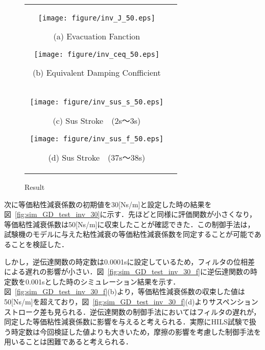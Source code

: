 \documentclass[a4paper,12pt]{article_vdlab_sotsuron}
\begin{document}
\begin{figure}[h!]
    \begin{tabular}{cc}
      \begin{minipage}{0.5\hsize}
        \centering
        \texttt{[image: figure/inv\_J\_50.eps]}
        \begin{center}
          \vspace{-4mm}
          \ (a) Evacuation Fanction\
        \end{center}
      \end{minipage}
      \begin{minipage}{0.5\hsize}
        \centering
        \texttt{[image: figure/inv\_ceq\_50.eps]}
        \begin{center}
          \vspace{-4mm}
          \ (b)  Equivalent Damping Confficient\
        \end{center}
      \end{minipage}\\
        \begin{minipage}{0.5\hsize}
          \centering
          \texttt{[image: figure/inv\_sus\_s\_50.eps]}
          \begin{center}
            \vspace{-4mm}
            \ (c) Sus Stroke　(2s～3s)\
          \end{center}
        \end{minipage}
        \begin{minipage}{0.5\hsize}
          \centering
          \texttt{[image: figure/inv\_sus\_f\_50.eps]}
          \begin{center}
            \vspace{-4mm}
            \ (d) Sus Stroke　(37s～38s)\
          \end{center}
        \end{minipage}
      \end{tabular}
      \vspace{1mm}
    \caption{Result}
    \label{fig:sim_GD_test_inv_50}
\end{figure}
\newpage
次に等価粘性減衰係数の初期値を30[Ns/m]と設定した時の結果を図~\ref{fig:sim_GD_test_inv_30}に示す．先ほどと同様に評価関数が小さくなり，等価粘性減衰係数は50[Ns/m]に収束したことが確認できた．この制御手法は，試験機のモデルに与えた粘性減衰の等価粘性減衰係数を同定することが可能であることを検証した．
\par
しかし，逆伝達関数の時定数は0.0001sに設定しているため，フィルタの位相差による遅れの影響が小さい．図~\ref{fig:sim_GD_test_inv_30_f}に逆伝達関数の時定数を0.001sとした時のシミュレーション結果を示す．図~\ref{fig:sim_GD_test_inv_30_f}(b)より，等価粘性減衰係数の収束した値は50[Ns/m]を超えており，図~\ref{fig:sim_GD_test_inv_30_f}(d)よりサスペンションストローク差も見られる．逆伝達関数の制御手法においてはフィルタの遅れが，同定した等価粘性減衰係数に影響を与えると考えられる．実際にHILS試験で扱う時定数は今回検証した値よりも大きいため，摩擦の影響を考慮した制御手法を用いることは困難であると考えられる．
\end{document}
